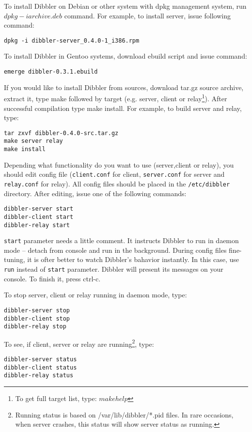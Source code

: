 To install Dibbler on Debian or other system with dpkg management
system, run $dpkg -i archive.deb$ command. For example, to install
server, issue following command:

\begin{verbatim}
dpkg -i dibbler-server_0.4.0-1_i386.rpm 
\end{verbatim}

To install Dibbler in Gentoo systems, download ebuild script and issue
command:

\begin{verbatim}
emerge dibbler-0.3.1.ebuild
\end{verbatim}

If you would like to install Dibbler from sources, download tar.gz
source archive, extract it, type make followed by target (e.g. server,
client or relay\footnote{To get full target list, type: $make
  help$}). After successful compilation type make install. For
example, to build server and relay, type:

\begin{verbatim}
tar zxvf dibbler-0.4.0-src.tar.gz
make server relay
make install
\end{verbatim}

Depending what functionality do you want to use (server,client or relay),
you should edit config file (\verb+client.conf+ for client, \verb+server.conf+
for server and \verb+relay.conf+ for relay). All config files should
be placed in the \verb+/etc/dibbler+ directory. After editing, issue one of
the following commands:

\begin{verbatim}
dibbler-server start
dibbler-client start
dibbler-relay start
\end{verbatim}

\verb+start+ parameter needs a little comment. It
instructs Dibbler to run in daemon mode -- detach from console and run
in the background. During config files fine-tuning, it is ofter better
to watch Dibbler's bahavior instantly. In this case, use \verb+run+
instead of \verb+start+ parameter. Dibbler will present its messages on
your console. To finish it, press ctrl-c.

To stop server, client or relay running in daemon mode, type:
\begin{verbatim}
dibbler-server stop
dibbler-client stop
dibbler-relay stop
\end{verbatim}

To see, if client, server or relay are running\footnote{Running status is
  based on /var/lib/dibbler/*.pid files. In rare
  occasions, when server crashes, this status will show server status as running.}, type:
\begin{verbatim}
dibbler-server status
dibbler-client status
dibbler-relay status
\end{verbatim}

